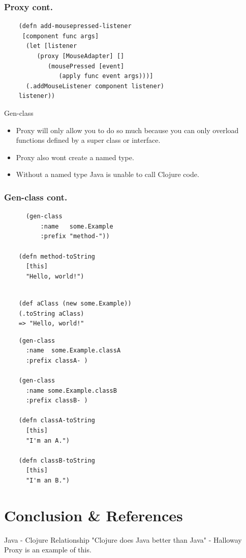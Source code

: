 \documentclass[xcolor=dvipsnames]{beamer}
\begin{document}
	\begin{frame}[fragile]
	\frametitle{Proxy cont.}
	\begin{verbatim}
	(defn add-mousepressed-listener
     [component func args]
      (let [listener 
         (proxy [MouseAdapter] []
            (mousePressed [event] 
               (apply func event args)))]
      (.addMouseListener component listener)
    listener))
	\end{verbatim}
	\end{frame}
	
	\begin{frame}{Gen-class}
	\begin{itemize}	
	\item Proxy will only allow you to do so much because you can only overload functions defined by a super class or interface.
	\item Proxy also wont create a named type.
        \pause
	\item Without a named type Java is unable to call Clojure code. 
	\end{itemize}
	\end{frame}
	
	\begin{frame}[fragile]
	\frametitle{Gen-class cont.}
		\begin{verbatim}
	  (gen-class
	      :name   some.Example 
	      :prefix "method-"))
	  
	(defn method-toString
	  [this]
	  "Hello, world!")
	  
	\end{verbatim}
	\pause
	\begin{verbatim}
	(def aClass (new some.Example))
	(.toString aClass)
	=> "Hello, world!"
	\end{verbatim}
	\end{frame}
	
	\begin{frame}[fragile]
		\begin{verbatim}
	(gen-class
	  :name  some.Example.classA
	  :prefix classA- )
	  
	(gen-class
	  :name some.Example.classB
	  :prefix classB- )
	  
	(defn classA-toString
	  [this]
	  "I'm an A.")
	  
	(defn classB-toString
	  [this]
	  "I'm an B.")
	\end{verbatim}
	\end{frame}
	
	\section{Conclusion \& References}
	\begin{frame}{Java - Clojure Relationship}
	"Clojure does Java better than Java" - Halloway
	\linebreak
	Proxy is an example of this.
	\end{frame}
	
\end{document}
